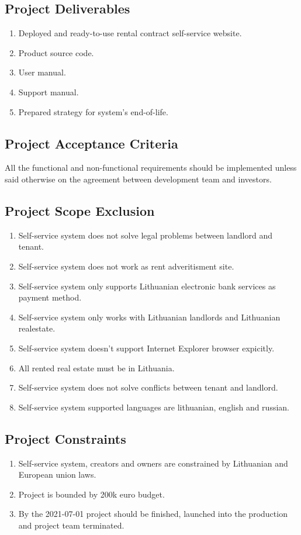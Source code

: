 \documentclass{VUMIFPSkursinis}
\begin{document}
	\subsection{Project Deliverables}
		\begin{enumerate}
			\item{Deployed and ready-to-use rental contract self-service website.}
			\item{Product source code.}
			\item{User manual.}
			\item{Support manual.}
			\item{Prepared strategy for system's end-of-life.}
		\end{enumerate}

	\subsection{Project Acceptance Criteria}
		All the functional and non-functional requirements should be implemented unless said otherwise on the agreement between development team and investors.

	\subsection{Project Scope Exclusion}
		\begin{enumerate}
			\item{Self-service system does not solve legal problems between landlord and tenant.}
			\item{Self-service system does not work as rent adveritisment site.}
			\item{Self-service system only supports Lithuanian electronic bank services as payment method.}
			\item{Self-service system only works with Lithuanian landlords and Lithuanian realestate.}
			\item{Self-service system doesn't support Internet Explorer browser expicitly.}
			\item{All rented real estate must be in Lithuania.}
			\item{Self-service system does not solve conflicts between tenant and landlord.}
			\item{Self-service system supported languages are lithuanian, english and russian.}
		\end{enumerate}

	\subsection{Project Constraints}
		\begin{enumerate}
			\item{Self-service system, creators and owners are constrained by Lithuanian and European union laws.}
			\item{Project is bounded by 200k euro budget.}
			\item{By the 2021-07-01 project should be finished, launched into the production and project team terminated.}
		\end{enumerate}
\end{document}
